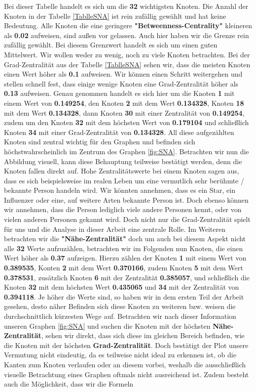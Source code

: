 Bei dieser Tabelle handelt es sich um die \textbf{32} wichtigsten Knoten. Die Anzahl der Knoten in der Tabelle \ref{TablleSNA} ist rein zufällig gewählt und hat keine Bedeutung. Alle Knoten die eine geringere \textbf{"Betweenness-Centrality"} kleineren als \textbf{0.02} aufweisen, sind außen vor gelassen. Auch hier haben wir die Grenze rein zufällig gewählt. Bei diesem Grenzwert handelt es sich um einen guten Mittelwert. Wir wollen weder zu wenig, noch zu viele Knoten betrachten.
Bei der Grad-Zentralität aus der Tabelle \ref{TablleSNA} sehen wir, dass die meisten Knoten einen Wert höher als \textbf{0.1} aufweisen. Wir können einen Schritt weitergehen und stellen schnell fest, dass einige wenige Knoten eine Grad-Zentralität höher als \textbf{0.13} aufweisen. Genau genommen handelt es sich hier um die Knoten \textbf{1} mit einem Wert von \textbf{0.149254}, den Knoten \textbf{2} mit dem Wert \textbf{0.134328}, Knoten \textbf{18} mit dem Wert \textbf{0.134328}, dann Knoten \textbf{30} mit einer Zentralität von \textbf{0.149254}, zudem um den Knoten \textbf{32} mit dem höchsten Wert von \textbf{0.179104} und schließlich Knoten \textbf{34} mit einer Grad-Zentralität von \textbf{0.134328}. All diese aufgezählten Knoten sind zentral wichtig für den Graphen und befinden sich höchstwahrscheinlich im Zentrum des Graphen \ref{fig:SNA}. Betrachten wir nun die Abbildung visuell, kann diese Behauptung teilweise bestätigt werden, denn die Knoten fallen direkt auf. Hohe Zentralitätswerte bei einem Knoten sagen aus, dass es sich beispielsweise im realen Leben um eine vermutlich sehr berühmte / bekannte Person handeln wird. Wir könnten annehmen, dass es ein Star, ein Influenzer oder eine, auf weitere Arten bekannte Person ist. Doch ebenso können wir annehmen, dass die Person lediglich viele andere Personen kennt, oder von vielen anderen Personen gekannt wird. Doch nicht nur die Grad-Zentralität spielt für uns und die Analyse in dieser Arbeit eine zentrale Rolle. Im Weiteren betrachten wir die \textbf{"Nähe-Zentralität"} doch um auch bei diesem Aspekt nicht alle \textbf{32} Werte aufzuzählen, betrachten wir im Folgenden nun Knoten, die einen Wert höher als \textbf{0.37} aufzeigen. Hierzu zählen der Knoten \textbf{1} mit einem Wert von \textbf{0.389535}, Konten \textbf{2} mit dem Wert \textbf{0.370166}, zudem Knoten \textbf{5} mit dem Wert \textbf{0.378531}, zusätzlich Knoten \textbf{6} mit der Zentralität \textbf{0.385057}, und schließlich die Knoten \textbf{32} mit dem höchsten Wert \textbf{0.435065} und \textbf{34} mit der Zentralität von \textbf{0.394118}. Je höher die Werte sind, so haben wir in dem ersten Teil der Arbeit gesehen, desto näher Befinden sich diese Knoten zu weiteren bzw. weisen die durchschnittlich kürzesten Wege auf. Betrachten wir nach dieser Information unseren Graphen \ref{fig:SNA} und suchen die Knoten mit der höchsten \textbf{Nähe-Zentralität}, sehen wir direkt, dass sich diese im gleichen Bereich befinden, wie die Knoten mit der höchsten \textbf{Grad-Zentralität}. Doch bestätigt der Plot unsere Vermutung nicht eindeutig, da es teilweise nicht ideal zu erkennen ist, ob die Kanten zum Knoten verlaufen oder an diesem vorbei, weshalb die ausschließlich visuelle Betrachtung eines Graphen oftmals nicht ausreichend ist. Zudem besteht auch die Möglichkeit, dass wir die Formeln 